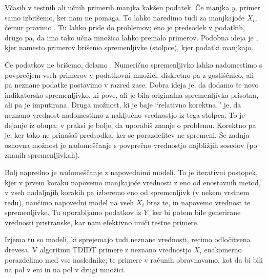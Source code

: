 
Včasih v testnih ali učnih primerih manjka kakšen podatek.
Če manjka $y$, primer samo izbrišemo, ker nam ne pomaga.
To lahko naredimo tudi za manjkajoče $X_i$, čemur pravimo .
Tu lahko pride do problemov; eno je predsodek v podatkih, drugo pa, da ima tako
učna množica lahko premalo primerov.
Podobna ideja je , kjer namesto primerov brišemo
spremenljivke (stolpce), kjer podatki manjkajo.


Če podatkov ne brišemo, delamo .
Numerično spremenljivko lahko nadomestimo s povprečjem vseh primerov v
podatkovni množici, diskretno pa z gostiščnico, ali pa neznane podatke postavimo
v razred zase.
Dobra ideja je, da dodamo še novo indikatorsko spremenljivko, ki pove, ali je
bila originalna spremenljivka prisotna, ali pa je imputirana.
Druga možnost, ki je baje \enquote{relativno korektna,} je, da neznano vrednost
nadomestimo z naključno vrednostjo iz tega stolpca.
To je dejanje iz obupa; v praksi je bolje, da uporabiš znanje o problemu.
Korektno pa je, ker tako ne prinašaš predsodka, ker se porazdelitev ne spremeni.
Še zadnja osnovna možnost je nadomeščanje s povprečno vrednostjo najbližjih
sosedov (po znanih spremenljivkah).


Bolj napredno je nadomeščanje z napovednimi modeli.
To je iterativni postopek, kjer v prvem koraku napovemo manjkajoče vrednosti z
eno od enostavnih metod, v vseh nadaljnjih korakih pa izberemo eno od
spremenljivk (v nekem vrstnem redu), naučimo napovedni model na vseh $X_i$ brez
te, in napovemo vrednost te spremenljivke.
Tu \poudarjenne{} uporabljamo podatkov iz $Y$, ker bi potem bile generirane
vrednosti pristranske, kar nam efektivno uniči testne primere.


Izjema tu so modeli, ki sprejemajo tudi neznane vrednosti, recimo odločitvena
drevesa.
V algoritmu TDIDT primere z neznano vrednostjo $X_i$ enakomerno porazdelimo med
vse naslednike; te primere v računih obravnavamo, kot da bi bili na pol v eni in
na pol v drugi množici.


